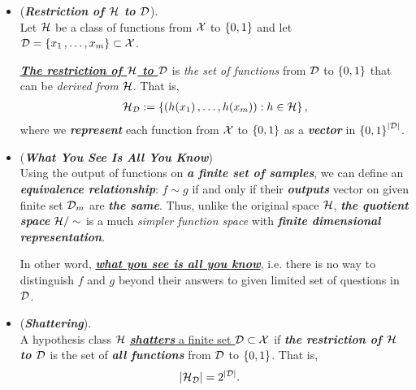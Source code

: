 \documentclass[11pt]{article}
\begin{document}
\begin{itemize}
\item \begin{definition} (\emph{\textbf{Restriction of ${\mathcal H}$ to ${\mathcal D}$}}). \\
Let ${\mathcal H}$ be a class of functions from ${\mathcal X}$ to $\left\{0,1\right\}$ and let ${\mathcal D} = \left\{x_1 \,{,}\ldots{,}\, x_m\right\} \subset {\mathcal X}$. 

\underline{\emph{\textbf{The restriction of ${\mathcal H}$ to ${\mathcal D}$}}} is \emph{the set of functions} from ${\mathcal D}$ to $\left\{0,1\right\}$ that can be \emph{derived from} ${\mathcal H}$. That is,
\begin{align*}
{\mathcal H}_{{\mathcal D}} := \left\{(h(x_1) \,{,}\ldots{,}\, h(x_m)): h \in {\mathcal H}\right\},
\end{align*}
where we \emph{\textbf{represent}} each function from ${\mathcal X}$ to $\left\{0,1\right\}$ as a \emph{\textbf{vector}} in $\left\{0,1\right\}^{\left\lvert {\mathcal D} \right\rvert}$.
\end{definition}

\item \begin{remark} (\textbf{\emph{What You See Is All You Know}})\\
Using the output of functions on \emph{\textbf{a finite set of samples}}, we can define an \emph{\textbf{equivalence relationship}}: $f \sim g$ if and only if their \emph{\textbf{outputs}} vector on given finite set ${\mathcal D}_m$ are \emph{\textbf{the same}}. Thus, unlike the original space ${\mathcal H}$, \emph{\textbf{the quotient space}} ${\mathcal H}/\sim$ is a much \emph{simpler function space} with \emph{\textbf{finite dimensional representation}}. 

In other word, \underline{\emph{\textbf{what you see is all you know}}}, i.e. there is no way to distinguish $f$ and $g$ beyond their answers to given limited set of questions in ${\mathcal D}$.

\end{remark}

\item \begin{definition}(\emph{\textbf{Shattering}}). \\
A hypothesis class ${\mathcal H}$ \underline{\emph{\textbf{shatters}} a finite set ${\mathcal D} \subset {\mathcal X}$} if \emph{\textbf{the restriction of ${\mathcal H}$ to ${\mathcal D}$}} is the set of \emph{\textbf{all functions}} from ${\mathcal D}$ to $\left\{0,1\right\}$. That is, 
\begin{align*}
\left\lvert {\mathcal H}_{{\mathcal D}} \right\rvert &= 2^{\left\lvert {\mathcal D} \right\rvert}.
\end{align*}
\end{definition}


\end{itemize}
\end{document}

